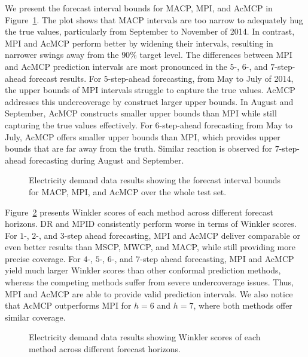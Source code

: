 \documentclass[
  11pt,
  a4paper,
]{article}
\theoremstyle{plain}
\theoremstyle{plain}
\theoremstyle{remark}
\begin{document}
We present the forecast interval bounds for MACP, MPI, and AcMCP in
Figure~\ref{fig-elec_timeplot}. The plot shows that MACP intervals are
too narrow to adequately hug the true values, particularly from
September to November of 2014. In contrast, MPI and AcMCP perform better
by widening their intervals, resulting in narrower swings away from the
\(90\%\) target level. The differences between MPI and AcMCP prediction
intervals are most pronounced in the \(5\)-, \(6\)-, and
\(7\)-step-ahead forecast results. For \(5\)-step-ahead forecasting,
from May to July of 2014, the upper bounds of MPI intervals struggle to
capture the true values. AcMCP addresses this undercoverage by construct
larger upper bounds. In August and September, AcMCP constructs smaller
upper bounds than MPI while still capturing the true values effectively.
For \(6\)-step-ahead forecasting from May to July, AcMCP offers smaller
upper bounds than MPI, which provides upper bounds that are far away
from the truth. Similar reaction is observed for \(7\)-step-ahead
forecasting during August and September.

\begin{figure}


\caption{\label{fig-elec_timeplot}Electricity demand data results
showing the forecast interval bounds for MACP, MPI, and AcMCP over the
whole test set.}

\end{figure}%

Figure~\ref{fig-elec_winkler} presents Winkler scores of each method
across different forecast horizons. DR and MPID consistently perform
worse in terms of Winkler scores. For \(1\)-, \(2\)-, and \(3\)-step
ahead forecasting, MPI and AcMCP deliver comparable or even better
results than MSCP, MWCP, and MACP, while still providing more precise
coverage. For \(4\)-, \(5\)-, \(6\)-, and \(7\)-step ahead forecasting,
MPI and AcMCP yield much larger Winkler scores than other conformal
prediction methods, whereas the competing methods suffer from severe
undercoverage issues. Thus, MPI and AcMCP are able to provide valid
prediction intervals. We also notice that AcMCP outperforms MPI for
\(h=6\) and \(h=7\), where both methods offer similar coverage.

\begin{figure}


\caption{\label{fig-elec_winkler}Electricity demand data results showing
Winkler scores of each method across different forecast horizons.}

\end{figure}%
\end{document}
